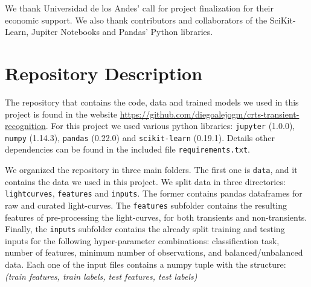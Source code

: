 \documentclass[a4paper,fleqn,usenatbib]{mnras}
\begin{document}
We thank Universidad de los Andes' call for project finalization for their economic support.
We also thank contributors and collaborators of the SciKit-Learn, Jupiter Notebooks and Pandas' Python libraries.











\appendix
\section{Repository Description} \label{section_code}

The repository that contains the code, data and trained models we used in this project is found in the website \url{https://github.com/diegoalejogm/crts-transient-recognition}. For this project we used various python libraries: \texttt{jupyter} (1.0.0), \texttt{numpy} (1.14.3), \texttt{pandas} (0.22.0) and \texttt{scikit-learn} (0.19.1). Details other dependencies can be found in the included file \texttt{requirements.txt}.

We organized the repository in three main folders. The first one is \texttt{data}, and it contains the data we used in this project. We split data in three directories: \texttt{lightcurves}, \texttt{features} and \texttt{inputs}. The former contains pandas dataframes for raw and curated light-curves. The \texttt{features} subfolder contains the resulting features of pre-processing the light-curves, for both transients and non-transients. Finally, the \texttt{inputs} subfolder contains the already split training and testing inputs for the following hyper-parameter combinations: classification task, number of features, minimum number of observations, and balanced/unbalanced data. Each one of the input files contains a numpy tuple with the structure: \textit{(train features, train labels, test features, test labels)}
\end{document}
